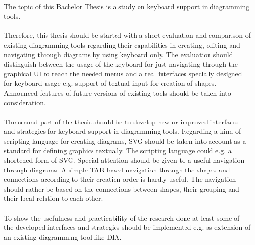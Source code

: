 \paragraph{}
The topic of this Bachelor Thesis is a study on keyboard support in diagramming tools.

\paragraph{}
Therefore, this thesis should be started with a short evaluation and comparison of existing diagramming tools regarding their capabilities in creating, editing and navigating through diagrams by using keyboard only. The evaluation should distinguish between the usage of the keyboard for just navigating through the graphical UI to reach the needed menus and a real interfaces specially designed for keyboard usage e.g. support of textual input for creation of shapes. Announced features of future versions of existing tools should be taken into consideration.

\paragraph{}
The second part of the thesis should be to develop new or improved interfaces and strategies for keyboard support in diagramming tools. Regarding a kind of scripting language for creating diagrams, SVG should be taken into account as a standard for defining graphics textually. The scripting language could e.g. a shortened form of SVG. Special attention should be given to a useful navigation through diagrams. A simple TAB-based navigation through the shapes and connections according to their creation order is hardly useful. The navigation should rather be based on the connections between shapes, their grouping and their local relation to each other.

\paragraph{}
To show the usefulness and practicability of the research done at least some of the developed interfaces and strategies should be implemented e.g. as extension of an existing diagramming tool like DIA.
